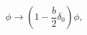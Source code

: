 \begin{equation}
\phi \to (1-\frac{b}{2} \delta_0) \phi, \label{scalarfirstorderredef}
\end{equation}

